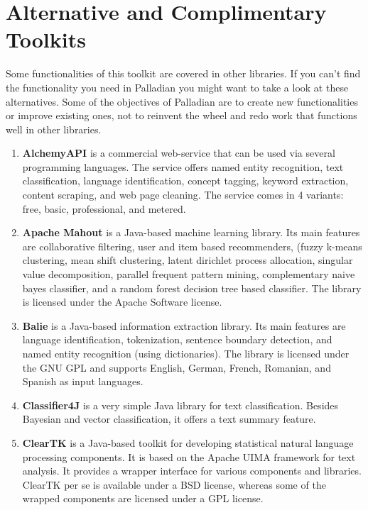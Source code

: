 \section{Alternative and Complimentary Toolkits}

\label{sec:alternativesToPalladian}
Some functionalities of this toolkit are covered in other libraries. If you can't find the functionality you need in Palladian you might want to take a look at these alternatives. Some of the objectives of Palladian are to create new functionalities or improve existing ones, not to reinvent the wheel and redo work that functions well in other libraries.

\begin{enumerate}

	\item \textbf{AlchemyAPI} \cite{alchemyapi} is a commercial web-service that can be used via several programming languages. The service offers named entity recognition, text classification, language identification, concept tagging, keyword extraction, content scraping, and web page cleaning.
The service comes in 4 variants: free, basic, professional, and metered.

	\item \textbf{Apache Mahout} \cite{settings2apache} is a Java-based machine learning library. Its main features are collaborative filtering, user and item based recommenders, (fuzzy k-means clustering, mean shift clustering, latent dirichlet process allocation, singular value decomposition, parallel frequent pattern mining, complementary naive bayes classifier, and a random forest decision tree based classifier.
The library is licensed under the Apache Software license.

	\item \textbf{Balie} \cite{balie} is a Java-based information extraction library. Its main features are language identification, tokenization, sentence boundary detection, and named entity recognition (using dictionaries).
The library is licensed under the GNU GPL and supports English, German, French, Romanian, and Spanish as input languages.

	\item \textbf{Classifier4J} \cite{classifier4j} is a very simple Java library for text classification. Besides Bayesian and vector classification, it offers a text summary feature.
	
	\item \textbf{ClearTK} \cite{cleartk, ogren_cleartk:uima_2008} is a Java-based toolkit for developing statistical natural language processing components. It is based on the Apache UIMA framework for text analysis. It provides a wrapper interface for various components and libraries. ClearTK per se is available under a BSD license, whereas some of the wrapped components are licensed under a GPL license.


\end{enumerate}
